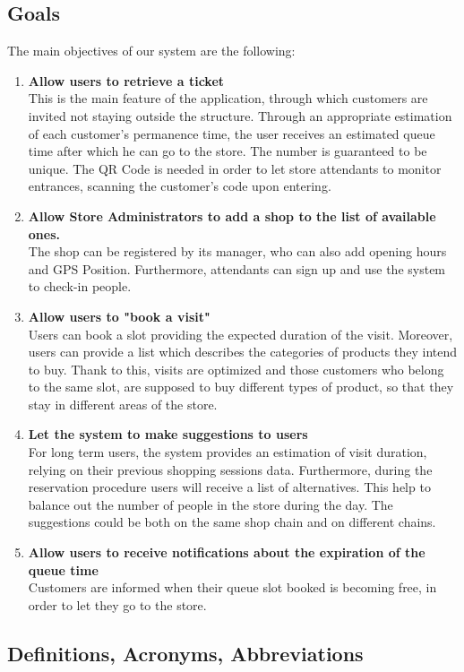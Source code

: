 \documentclass[table, 12pt]{article}
\begin{document}
\subsection{Goals}
\label{goals}
The main objectives of our system are the following:
\begin{enumerate}[label=$\bullet$ \textbf{G\arabic*:}]
    \item \textbf{Allow users to retrieve a ticket}\\This is the main feature of the application, through which customers are invited not staying outside the structure. Through an appropriate estimation of each customer's permanence time, the user receives an estimated queue time after which he can go to the store. The number is guaranteed to be unique. The QR Code is needed in order to let store attendants to monitor entrances, scanning the customer's code upon entering.
    \item \textbf{Allow Store Administrators to add a shop to the list of available ones.}\\The shop can be registered by its manager, who can also add opening hours and GPS Position. Furthermore, attendants can sign up and use the system to check-in people.
    \item \textbf{Allow users to "book a visit"}\\Users can book a slot providing the expected duration of the visit. Moreover, users can provide a list which describes the categories of products they intend to buy. Thank to this, visits are optimized and those customers who belong to the same slot, are supposed to buy different types of product, so that they stay in different areas of the store.
    \item \textbf{Let the system to make suggestions to users}\\For long term users, the system provides an estimation of visit duration, relying on their previous shopping sessions data. Furthermore, during the reservation procedure users will receive a list of alternatives. This help to balance out the number of people in the store during the day. The suggestions could be both on the same shop chain and on different chains.
    \item \textbf{Allow users to receive notifications about the expiration of the queue time}\\Customers are informed when their queue slot booked is becoming free, in order to let they go to the store.
\end{enumerate}
\subsection{Definitions, Acronyms, Abbreviations}
\end{document}
